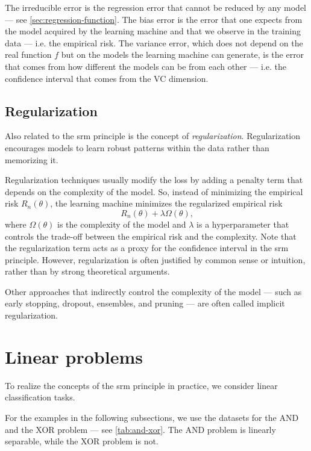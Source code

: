 The irreducible error is the regression error that cannot be reduced by any model --- see
\cref{sec:regression-function}.  The bias error is the error that one expects from the
model acquired by the learning machine and that we observe in the training data --- i.e.
the empirical risk.  The variance error, which does not depend on the real function $f$
but on the models the learning machine can generate, is the error that comes from how
different the models can be from each other --- i.e. the confidence interval that comes from
the VC dimension.

\subsection{Regularization}

Also related to the \gls{srm} principle is the concept of \emph{regularization}.
Regularization encourages models to learn robust patterns within the data rather than
memorizing it.

Regularization techniques usually modify the loss by adding a penalty term that
depends on the complexity of the model.  So, instead of minimizing the empirical risk
$R_n(\theta)$, the learning machine minimizes the regularized empirical risk
\[
  R_n(\theta) + \lambda \Omega(\theta)\text{,}
\]
where $\Omega(\theta)$ is the complexity of the model and $\lambda$ is a hyperparameter
that controls the trade-off between the empirical risk and the complexity.
Note that the regularization term acts as a proxy for the confidence interval in the
\gls{srm} principle.  However, regularization is often justified by common sense or
intuition, rather than by strong theoretical arguments.

Other approaches that indirectly control the complexity of the model --- such as early
stopping, dropout, ensembles, and pruning --- are often called implicit regularization.

\section{Linear problems}

To realize the concepts of the \gls{srm} principle in practice, we consider linear
classification tasks.

For the examples in the following subsections, we use the datasets for the AND
and the XOR problem --- see \cref{tab:and-xor}.
The AND problem is linearly separable, while the XOR problem is not.

